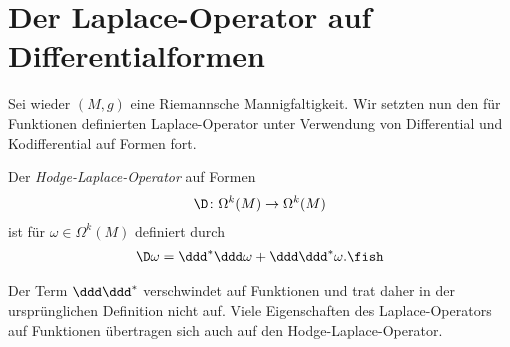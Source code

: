 \documentclass[%
	paper=a5,%
	fleqn,%
	DIV=18,%
	BCOR=0mm,
	fontsize=11pt,
	titlepage=false,%
	bibliography=totoc,
	DIV=18,%
	twoside=true,
	pdftitle=Riemannsche Geometrie,
	pdfauthor=Uwe Semmelmann,
	numbers=noendperiod]%
	{scrbook}
\begin{document}
\section{Der Laplace-Operator auf Differentialformen}

Sei wieder $(M,g)$ eine Riemannsche Mannigfaltigkeit. Wir setzten nun den für Funktionen definierten Laplace-Operator unter Verwendung von Differential und Kodifferential auf Formen fort.

\begin{defn}
Der \emph{Hodge-Laplace-Operator} auf Formen
\begin{align*}
\D \colon \Omega^k(M)\to \Omega^k(M)
\end{align*}
ist für $\omega\in\Omega^k(M)$ definiert durch
\begin{align*}
\D\omega = \ddd^*\ddd\omega + \ddd\ddd^*\omega.\fish
\end{align*}
\end{defn}

Der Term $\ddd\ddd^*$ verschwindet auf Funktionen und trat daher in der ursprünglichen Definition nicht auf. Viele Eigenschaften des Laplace-Operators auf Funktionen übertragen sich auch auf den Hodge-Laplace-Operator.
\end{document}
